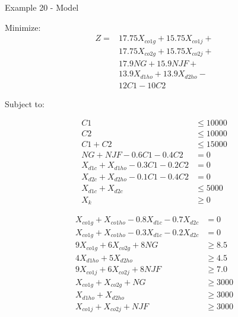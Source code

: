 \begin{frame}{Example 20 - Model}

Minimize:
\begin{align*}
    Z =& 17.75X_{co1g} + 15.75X_{co1j} + \\
       & 17.75X_{co2g} + 15.75X_{co2j} + \\
       & 17.9NG + 15.9NJF + \\
       & 13.9X_{d1ho} + 13.9X_{d2ho} - \\
       & 12C1 - 10C2
\end{align*}

Subject to:
\vspace{-1cm}
\begin{multicols}{2}
\tiny{
\begin{align*}
    C1 &\le 10000 \\
    C2 &\le 10000 \\
    C1 + C2 &\le 15000 \\
    NG + NJF - 0.6C1 - 0.4C2 &= 0 \\
    X_{d1c} + X_{d1ho} - 0.3C1 - 0.2C2 &= 0 \\
    X_{d2c} + X_{d2ho} - 0.1C1 - 0.4C2 &= 0 \\
    X_{d1c} + X_{d2c} &\le 5000 \\
    X_{k} &\ge 0
\end{align*}
}

\vfill
\columnbreak

\tiny{
\begin{align*}
    X_{co1g} + X_{co1ho} - 0.8X_{d1c} - 0.7X_{d2c} &= 0 \\
    X_{co1g} + X_{co1ho} - 0.3X_{d1c} - 0.2X_{d2c} &= 0 \\
    9X_{co1g} + 6X_{co2g} + 8NG &\ge 8.5 \\
    4X_{d1ho} + 5X_{d2ho} &\ge 4.5 \\
    9X_{co1j} + 6X_{co2j} + 8NJF &\ge 7.0 \\
    X_{co1g} + X_{co2g} + NG &\ge 3000 \\
    X_{d1ho} + X_{d2ho} &\ge 3000 \\
    X_{co1j} + X_{co2j} + NJF &\ge 3000
\end{align*}
}
\end{multicols}

\end{frame}
